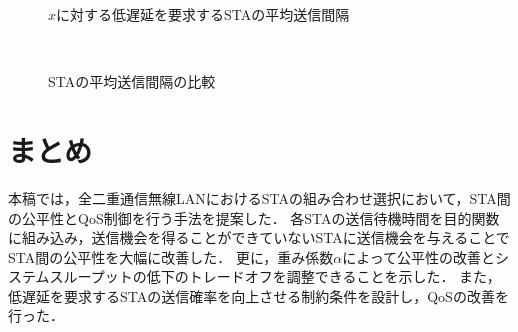 \documentclass[twocolumn, a4paper]{ieicejsp}
\begin{document}
		\begin{figure}[t]
			\centering
			\caption{$x$に対する低遅延を要求するSTAの平均送信間隔}
			\label{fig:chnx}
		\end{figure}

		\begin{figure}[t]
			\centering
			\\
			\caption{STAの平均送信間隔の比較}
			\label{fig:inter}
		\end{figure}

\section{まとめ}
	本稿では，全二重通信無線LANにおけるSTAの組み合わせ選択において，STA間の公平性とQoS制御を行う手法を提案した．
	各STAの送信待機時間を目的関数に組み込み，送信機会を得ることができていないSTAに送信機会を与えることで
	STA間の公平性を大幅に改善した．
	更に，重み係数$\alpha$によって公平性の改善とシステムスループットの低下のトレードオフを調整できることを示した．
	また，低遅延を要求するSTAの送信確率を向上させる制約条件を設計し，QoSの改善を行った．



\end{document}
